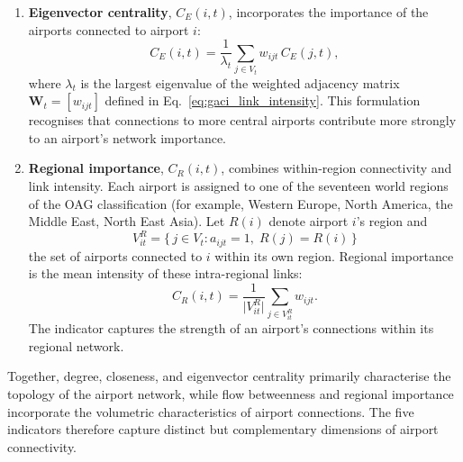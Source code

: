 \begin{enumerate}
    \item \textbf{Eigenvector centrality}, $C_E(i,t)$, incorporates the importance of the airports connected to airport $i$:
    \begin{equation}
        C_E(i,t)
        =
        \frac{1}{\lambda_t}
        \sum_{j\in V_t} w_{ijt}\, C_E(j,t),
        \label{eq:gaci_eigenvector}
    \end{equation}
    where $\lambda_t$ is the largest eigenvalue of the weighted adjacency matrix $\mathbf{W}_t=[w_{ijt}]$ defined in Eq.~\eqref{eq:gaci_link_intensity}. This formulation recognises that connections to more central airports contribute more strongly to an airport's network importance.

    \item \textbf{Regional importance}, $C_R(i,t)$, combines within-region connectivity and link intensity. Each airport is assigned to one of the seventeen world regions of the OAG classification (for example, Western Europe, North America, the Middle East, North East Asia). Let $R(i)$ denote airport $i$'s region and
    \begin{equation}
        V^R_{it} = \bigl\{\, j \in V_t : a_{ijt}=1,\; R(j)=R(i) \,\bigr\}
        \label{eq:gaci_region_set}
    \end{equation}
    the set of airports connected to $i$ within its own region. Regional importance is the mean intensity of these intra-regional links:
    \begin{equation}
        C_R(i,t)
        =
        \frac{1}{\bigl|V^R_{it}\bigr|}
        \sum_{j \in V^R_{it}} w_{ijt}.
        \label{eq:gaci_regimp}
    \end{equation}
    The indicator captures the strength of an airport's connections within its regional network.
\end{enumerate}

Together, degree, closeness, and eigenvector centrality primarily characterise the topology of the airport network, while flow betweenness and regional importance incorporate the volumetric characteristics of airport connections. The five indicators therefore capture distinct but complementary dimensions of airport connectivity.

